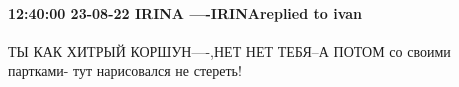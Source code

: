  
 
 
 
 

\paragraph{12:40:00 23-08-22 IRINA ----IRINAreplied to ivan}

ТЫ КАК ХИТРЫЙ КОРШУН----,НЕТ НЕТ ТЕБЯ--А ПОТОМ со своими партками- тут
нарисовался не стереть!

